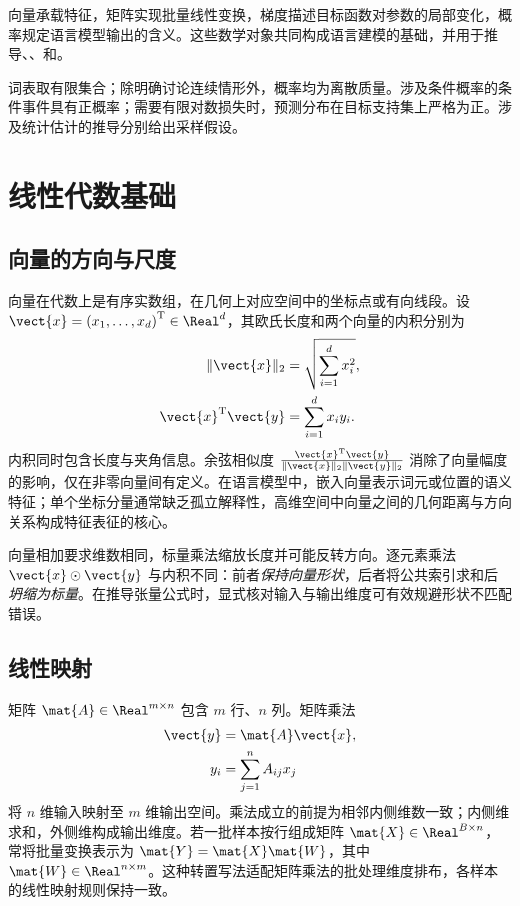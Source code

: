 \documentclass[../textbook.tex]{subfiles}
\begin{document}
\fi
{}

向量承载特征，矩阵实现批量线性变换，梯度描述目标函数对参数的局部变化，概率规定语言模型输出的含义。这些数学对象共同构成语言建模的基础，并用于推导、、和。

\begin{assumption}
词表取有限集合；除明确讨论连续情形外，概率均为离散质量。涉及条件概率的条件事件具有正概率；需要有限对数损失时，预测分布在目标支持集上严格为正。涉及统计估计的推导分别给出采样假设。
\end{assumption}

\section{线性代数基础}

\subsection{向量的方向与尺度}
向量在代数上是有序实数组，在几何上对应空间中的坐标点或有向线段。设
$\vect{x}={(x_1,\ldots,x_d)}^{\mathrm{T}}\in\Real^d$，其欧氏长度和两个向量的内积分别为
\begin{equation}
\begin{aligned}
 \lVert \vect{x}\rVert_2 &= \sqrt{\sum_{i=1}^{d}x_i^2}, \\
 \vect{x}^{\mathrm{T}}\vect{y} &= \sum_{i=1}^{d}x_i y_i.
\end{aligned}
\end{equation}
内积同时包含长度与夹角信息。余弦相似度
$\frac{\vect{x}^{\mathrm{T}}\vect{y}}{\lVert \vect{x}\rVert_2\lVert \vect{y}\rVert_2}$
消除了向量幅度的影响，仅在非零向量间有定义。在语言模型中，嵌入向量表示词元或位置的语义特征；单个坐标分量通常缺乏孤立解释性，高维空间中向量之间的几何距离与方向关系构成特征表征的核心。

向量相加要求维数相同，标量乘法缩放长度并可能反转方向。逐元素乘法 $\vect{x}\odot \vect{y}$ 与内积不同：前者\emph{保持向量形状}，后者将公共索引求和后\emph{坍缩为标量}。在推导张量公式时，显式核对输入与输出维度可有效规避形状不匹配错误。

\subsection{线性映射}
矩阵 $\mat{A}\in\Real^{m\times n}$ 包含 $m$ 行、$n$ 列。矩阵乘法
\begin{equation}
\begin{aligned}
 \vect{y} &= \mat{A}\vect{x}, \\
 y_i &= \sum_{j=1}^{n}A_{ij}x_j
\end{aligned}
\end{equation}
将 $n$ 维输入映射至 $m$ 维输出空间。乘法成立的前提为相邻内侧维数一致；内侧维求和，外侧维构成输出维度。若一批样本按行组成矩阵 $\mat{X}\in\Real^{B\times n}$，常将批量变换表示为 $\mat{Y}=\mat{X}\mat{W}$，其中 $\mat{W}\in\Real^{n\times m}$。这种转置写法适配矩阵乘法的批处理维度排布，各样本的线性映射规则保持一致。
\end{document}
